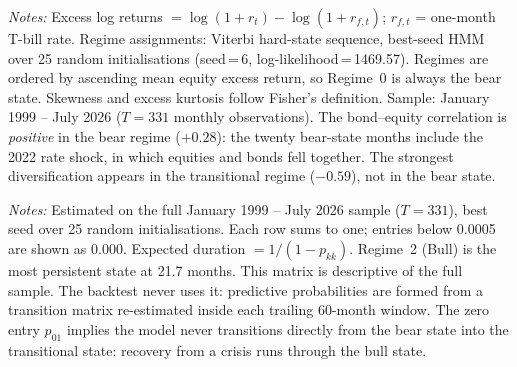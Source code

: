 \documentclass[11pt, a4paper]{article}
\begin{document}
\begin{table}[htbp]
{\begin{tabular}{llrrrrrrc}
\end{tabular}}
\begin{minipage}{\linewidth}
\vspace{4pt}\footnotesize
\textit{Notes:} Excess log returns $= \log(1+r_t) - \log(1+r_{f,t})$; $r_{f,t}$ = one-month T-bill rate.
Regime assignments: Viterbi hard-state sequence, best-seed HMM over 25 random initialisations
(seed\,=\,6, log-likelihood\,=\,1469.57). Regimes are ordered by ascending mean equity excess
return, so Regime~0 is always the bear state. Skewness and excess kurtosis follow Fisher's
definition. Sample: January 1999 -- July 2026 ($T = 331$ monthly observations).
The bond--equity correlation is \emph{positive} in the bear regime ($+0.28$): the twenty
bear-state months include the 2022 rate shock, in which equities and bonds fell together. The
strongest diversification appears in the transitional regime ($-0.59$), not in the bear state.
\end{minipage}
\end{table}

\begin{table}[htbp]
\centering
\caption{HMM Transition Probability Matrix and Regime Persistence (1999--2026)}
\label{tab:transition}
\setlength{\tabcolsep}{8pt}
\small
{}
\begin{minipage}{\linewidth}
\vspace{4pt}\footnotesize
\textit{Notes:} Estimated on the full January 1999 -- July 2026 sample ($T=331$), best seed over
25 random initialisations. Each row sums to one; entries below 0.0005 are shown as 0.000.
Expected duration $=1/(1-p_{kk})$. Regime~2 (Bull) is the most persistent state at 21.7 months.
This matrix is descriptive of the full sample. The backtest never uses it: predictive
probabilities are formed from a transition matrix re-estimated inside each trailing 60-month
window.
The zero entry $p_{01}$ implies the model never transitions directly from the bear state into
the transitional state: recovery from a crisis runs through the bull state.
\end{minipage}
\end{table}
\end{document}
